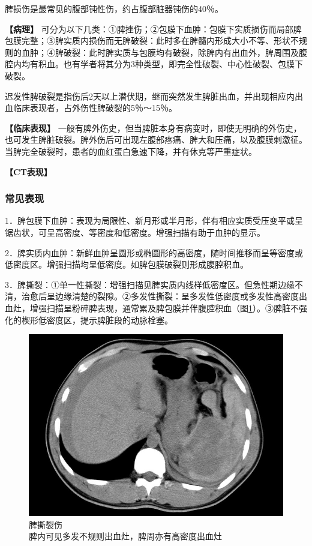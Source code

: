 脾损伤是最常见的腹部钝性伤，约占腹部脏器钝伤的40％。

\textbf{【病理】}
可分为以下几类：①脾挫伤；②包膜下血肿：包膜下实质损伤而局部脾包膜完整；③脾实质内损伤而无脾破裂：此时多在脾髓内形成大小不等、形状不规则的血肿；④脾破裂：此时脾实质与包膜均有破裂，除脾内有出血外，脾周围及腹腔内均有积血。也有学者将其分为3种类型，即完全性破裂、中心性破裂、包膜下破裂。

迟发性脾破裂是指伤后2天以上潜伏期，继而突然发生脾脏出血，并出现相应内出血临床表现者，占外伤性脾破裂的5％～15％。

\textbf{【临床表现】}
一般有脾外伤史，但当脾脏本身有病变时，即使无明确的外伤史，也可发生脾脏破裂。脾外伤后可出现左腹部疼痛、脾大和压痛，以及腹膜刺激征。当脾完全破裂时，患者的血红蛋白急速下降，并有休克等严重症状。

\textbf{【CT表现】}

\subsubsection{常见表现}

1．脾包膜下血肿：表现为局限性、新月形或半月形，伴有相应实质受压变平或呈锯齿状，可呈高密度、等密度和低密度。增强扫描有助于血肿的显示。

2．脾实质内血肿：新鲜血肿呈圆形或椭圆形的高密度，随时间推移而呈等密度或低密度区。增强扫描均呈低密度。如脾包膜破裂则形成腹腔积血。

3．脾撕裂：①单一性撕裂：增强扫描见脾实质内线样低密度区。但急性期边缘不清，治愈后呈边缘清楚的裂隙。②多发性撕裂：呈多发性低密度或多发性高密度出血灶，增强扫描呈粉碎脾表现，通常累及脾包膜并伴腹腔积血（图\ref{fig20-2}）。③脾脏不强化的楔形低密度区，提示脾脏段的动脉栓塞。

\begin{figure}[!htbp]
 \centering
 \includegraphics[width=.7\textwidth,height=\textheight,keepaspectratio]{./images/Image00390.jpg}
 \captionsetup{justification=centering}
 \caption{脾撕裂伤\\{\small 脾内可见多发不规则出血灶，脾周亦有高密度出血灶}}
 \label{fig20-2}
  \end{figure} 

